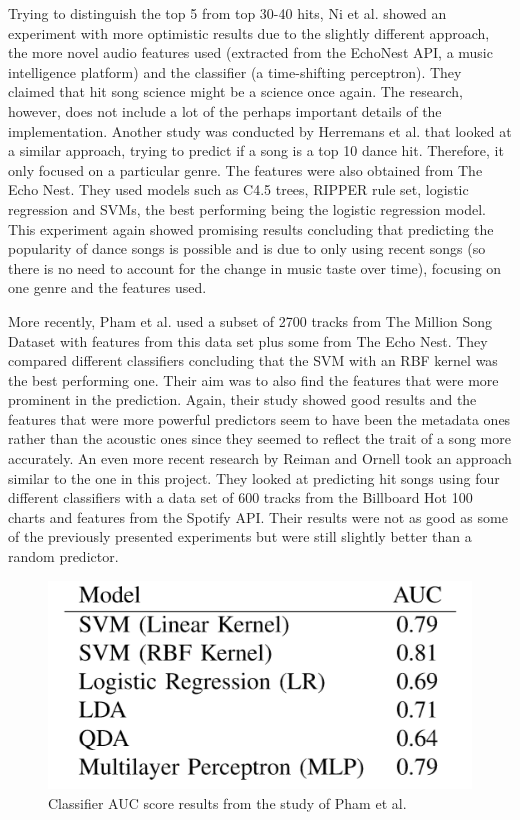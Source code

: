 Trying to distinguish the top 5 from top 30-40 hits, Ni et al. \cite{ni2011hit} showed an experiment with more optimistic results due to the slightly different approach, the more novel audio features used (extracted from the EchoNest API, a music intelligence platform) and the classifier (a time-shifting perceptron). They claimed that hit song science might be a science once again. The research, however, does not include a lot of the perhaps important details of the implementation. Another study was conducted by Herremans et al. \cite{herremans2014dance} that looked at a similar approach, trying to predict if a song is a top 10 dance hit. Therefore, it only focused on a particular genre. The features were also obtained from The Echo Nest. They used models such as C4.5 trees, RIPPER rule set, logistic regression and SVMs, the best performing being the logistic regression model. This experiment again showed promising results concluding that predicting the popularity of dance songs is possible and is due to only using recent songs (so there is no need to account for the change in music taste over time), focusing on one genre and the features used.

More recently, Pham et al. \cite{pham2016predicting} used a subset of 2700 tracks from The Million Song Dataset \cite{bertin2011million} with features from this data set plus some from The Echo Nest. They compared different classifiers concluding that the SVM with an RBF kernel was the best performing one. Their aim was to also find the features that were more prominent in the prediction. Again, their study showed good results and the features that were more powerful predictors seem to have been the metadata ones rather than the acoustic ones since they seemed to reflect the trait of a song more accurately. An even more recent research by Reiman and Ornell \cite{reiman2018predicting} took an approach similar to the one in this project. They looked at predicting hit songs using four different classifiers with a data set of 600 tracks from the Billboard Hot 100 charts and features from the Spotify API. Their results were not as good as some of the previously presented experiments but were still slightly better than a random predictor.

\begin{figure}[h]
\centering
\includegraphics[width=0.7\linewidth]{background/fig/pic1.PNG}
\caption{Classifier AUC score results from the study of Pham et al. \cite{pham2016predicting}}
\label{fig:pham1}
\end{figure}

